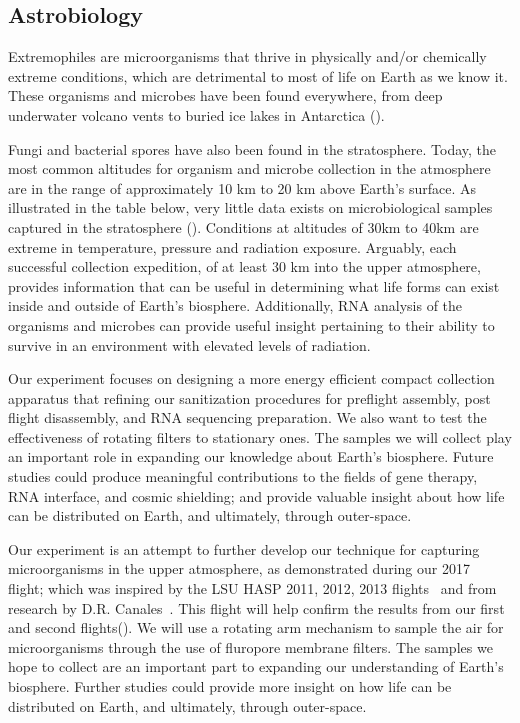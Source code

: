 \subsection{Astrobiology}
\label{sec:AstrobiologyBackground}

Extremophiles are microorganisms that thrive in physically and/or chemically extreme conditions, which are detrimental to most of life on Earth as we know it. These organisms and microbes have been found everywhere, from deep underwater volcano vents to buried ice lakes in Antarctica (\cite{Extremophiles}). 

Fungi and bacterial spores have also been found in the stratosphere. Today, the most common altitudes for organism and microbe collection in the atmosphere are in the range of approximately 10 km to 20 km above Earth’s surface. As illustrated in the table below, very little data exists on microbiological samples captured in the stratosphere (\cite{Extremophiles}). Conditions at altitudes of 30km to 40km are extreme in temperature, pressure and radiation exposure. Arguably, each successful collection expedition, of at least 30 km into the upper atmosphere, provides information that can be useful in determining what life forms can exist inside and outside of Earth’s biosphere. Additionally, RNA analysis of the organisms and microbes can provide useful insight pertaining to their ability to survive in an environment with elevated levels of radiation.  

 Our experiment focuses on designing a more energy efficient compact collection apparatus that refining our sanitization procedures for preflight assembly, post flight disassembly, and RNA sequencing preparation. We also want to test the effectiveness of rotating filters to stationary ones. The samples we will collect play an important role in expanding our knowledge about Earth’s biosphere. Future studies could produce meaningful contributions to the fields of gene therapy, RNA interface, and cosmic shielding; and provide valuable insight about how life can be distributed on Earth, and ultimately, through outer-space.


Our experiment is an attempt to further develop our technique for capturing microorganisms in the upper atmosphere, as demonstrated during our 2017~\cite{SORA1} flight; which was inspired by the LSU HASP 2011, 2012, 2013 flights~\cite{LSU} and from research by D.R. Canales~\cite{Canales}.  This flight will help confirm the results from our first and second flights(\cite{SORA2}).  We will use a rotating arm mechanism to sample the air for microorganisms through the use of fluropore membrane filters. The samples we hope to collect are an important part to expanding our understanding of Earth's biosphere. Further studies could provide more insight on how life can be distributed on Earth, and ultimately, through outer-space.

